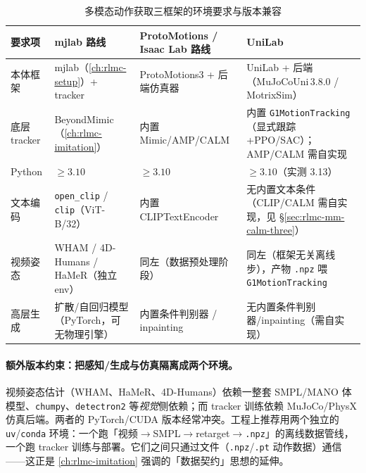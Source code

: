 \begin{table}[ht]
\centering
\small
\caption{多模态动作获取三框架的环境要求与版本兼容}
\label{tab:rlmc-mm-req}
\begin{tabularx}{\linewidth}{@{}lLLL@{}}
\toprule
要求项 & mjlab 路线 & ProtoMotions / Isaac Lab 路线 & UniLab \\
\midrule
本体框架 & mjlab（\cref{ch:rlmc-setup}）+ tracker & ProtoMotions3 + 后端仿真器 & UniLab + 后端（MuJoCoUni\,3.8.0 / MotrixSim） \\
底层 tracker & BeyondMimic（\cref{ch:rlmc-imitation}） & 内置 Mimic/AMP/CALM & 内置 \texttt{G1MotionTracking}（显式跟踪+PPO/SAC）；AMP/CALM 需自实现 \\
Python & $\ge 3.10$ & $\ge 3.10$ & $\ge 3.10$（实测 3.13） \\
文本编码 & \texttt{open\_clip} / \texttt{clip}（ViT-B/32） & 内置 CLIPTextEncoder & 无内置文本条件（CLIP/CALM 需自实现，见 \S\ref*{sec:rlmc-mm-calm-three}） \\
视频姿态 & WHAM / 4D-Humans / HaMeR（独立 env） & 同左（数据预处理阶段） & 同左（框架无关离线步），产物 \texttt{.npz} 喂 \texttt{G1MotionTracking} \\
高层生成 & 扩散/自回归模型（PyTorch，可无物理引擎） & 内置条件判别器 / inpainting & 无内置条件判别器/inpainting（需自实现） \\
\bottomrule
\end{tabularx}
\end{table}

\paragraph{额外版本约束：把感知/生成与仿真隔离成两个环境。}视频姿态估计（WHAM、HaMeR、4D-Humans）依赖一整套 SMPL/MANO 体模型、\verb|chumpy|、\verb|detectron2| 等\emph{视觉}侧依赖；而 tracker 训练依赖 MuJoCo/PhysX 仿真后端。两者的 PyTorch/CUDA 版本经常冲突。工程上推荐用两个独立的 \verb|uv|/\allowbreak\verb|conda| 环境：一个跑「视频$\to$SMPL$\to$retarget$\to$\texttt{.npz}」的离线数据管线，一个跑 tracker 训练与部署。它们之间只通过文件（\texttt{.npz}/\allowbreak\texttt{.pt} 动作数据）通信——这正是 \cref{ch:rlmc-imitation} 强调的「数据契约」思想的延伸。


